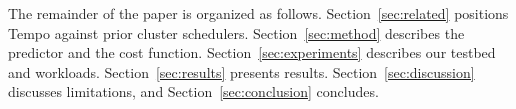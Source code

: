The remainder of the paper is organized as follows. Section~\ref{sec:related}
positions Tempo against prior cluster schedulers. Section~\ref{sec:method}
describes the predictor and the cost function. Section~\ref{sec:experiments}
describes our testbed and workloads. Section~\ref{sec:results} presents
results. Section~\ref{sec:discussion} discusses limitations, and
Section~\ref{sec:conclusion} concludes.
